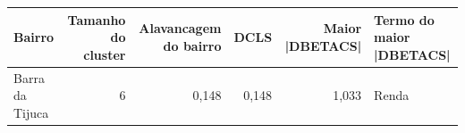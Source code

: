 
\begin{tabular}{lrrrrl}
\toprule
Bairro & Tamanho do cluster & Alavancagem do bairro & DCLS & Maior |DBETACS| & Termo do maior |DBETACS|\\
\midrule
Barra da Tijuca & 6 & 0,148 & 0,148 & 1,033 & Renda\\
\bottomrule
\end{tabular}
